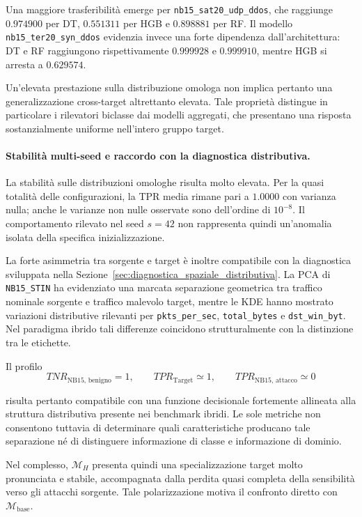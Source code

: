 Una maggiore trasferibilità emerge per \texttt{nb15\_sat20\_udp\_ddos}, che raggiunge $0.974900$ per DT, $0.551311$ per HGB e $0.898881$ per RF. 
Il modello \texttt{nb15\_ter20\_syn\_ddos} evidenzia invece una forte dipendenza dall'architettura: DT e RF raggiungono rispettivamente $0.999928$ e $0.999910$, mentre HGB si arresta a $0.629574$.

Un'elevata prestazione sulla distribuzione omologa non implica pertanto una generalizzazione cross-target altrettanto elevata. 
Tale proprietà distingue in particolare i rilevatori biclasse dai modelli aggregati, che presentano una risposta sostanzialmente uniforme nell'intero gruppo target.

\paragraph{Stabilità multi-seed e raccordo con la diagnostica distributiva.}
La stabilità sulle distribuzioni omologhe risulta molto elevata.  Per la quasi totalità delle configurazioni, la TPR media rimane pari a $1.0000$ con varianza nulla; anche le varianze non nulle osservate sono dell'ordine di $10^{-8}$. 
Il comportamento rilevato nel seed $s=42$ non rappresenta quindi un'anomalia isolata della specifica inizializzazione.

La forte asimmetria tra sorgente e target è inoltre compatibile con la diagnostica sviluppata nella Sezione~\ref{sec:diagnostica_spaziale_distributiva}. 
La PCA di \texttt{NB15\_STIN} ha evidenziato una marcata separazione geometrica tra traffico nominale sorgente e traffico malevolo target, mentre le KDE hanno
mostrato variazioni distributive rilevanti per \texttt{pkts\_per\_sec}, \texttt{total\_bytes} e \texttt{dst\_win\_byt}. 
Nel paradigma ibrido tali differenze coincidono strutturalmente con la distinzione tra le etichette.

Il profilo
\[
    TNR_{\text{NB15, benigno}}=1,
    \qquad
    TPR_{\text{Target}}\simeq1,
    \qquad
    TPR_{\text{NB15, attacco}}\simeq0
\]

risulta pertanto compatibile con una funzione decisionale fortemente allineata alla struttura distributiva presente nei benchmark ibridi. 
Le sole metriche non consentono tuttavia di determinare quali caratteristiche producano tale separazione né di distinguere informazione di classe e informazione di dominio.

Nel complesso, $\mathcal{M}_{H}$ presenta quindi una specializzazione target molto pronunciata e stabile, accompagnata dalla perdita quasi completa della sensibilità verso gli attacchi sorgente. 
Tale polarizzazione motiva il confronto diretto con $\mathcal{M}_{\mathrm{base}}$.


